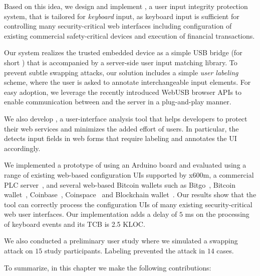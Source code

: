  Based on this idea, we design and implement \name, a user input integrity protection system, that is tailored for \emph{keyboard} input, as keyboard input is sufficient for controlling many security-critical web interfaces including configuration of existing commercial safety-critical devices and execution of financial transactions.

Our system realizes the trusted embedded device as a simple USB bridge (for short \device) that is accompanied by a server-side user input matching library. To prevent subtle swapping attacks, our solution includes a simple \emph{user labeling} scheme, where the user is asked to annotate interchangeable input elements. For easy adoption, we leverage the recently introduced WebUSB browser APIs to enable communication between \device and the server in a plug-and-play manner. 

We also develop \tool, a user-interface analysis tool that helps developers to protect their web services and minimizes the added effort of users. In particular, the \tool detects input fields in web forms that require labeling and annotates the UI accordingly. 

We implemented a prototype of \device using an Arduino board and evaluated \tool using a range of existing web-based configuration UIs supported by x600m, a commercial PLC server~\cite{controlbyweb}, and several web-based Bitcoin wallets such as Bitgo~\cite{bitgo}, Bitcoin wallet~\cite{bitcoinwallet}, Coinbase~\cite{coinbase}, Coinspace~\cite{coin} and Blockchain wallet~\cite{blockchain}. Our results show that the tool can correctly process the configuration UIs of many existing security-critical web user interfaces. Our \device implementation adds a delay of $5$ ms on the processing of keyboard events and its TCB is 2.5 KLOC. 

We also conducted a preliminary user study where we simulated a swapping attack on $15$ study participants. Labeling prevented the attack in $14$ cases.


 To summarize, in this chapter we make the following contributions:

